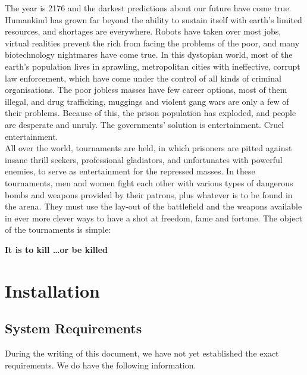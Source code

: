 \documentclass[a4paper,twoside,11pt]{book}
\theoremstyle{plain} \newtheorem{powerup}{Power-Up}
\begin{document}
   The year is 2176 and the darkest predictions about our future have come true. Humankind has grown far beyond the ability to sustain itself with earth's limited resources, and shortages are everywhere. Robots have taken over most jobs, virtual realities prevent the rich from facing the problems of the poor, and many biotechnology nightmares have come true. In this dystopian world, most of the earth's population lives in sprawling, metropolitan cities with ineffective, corrupt law enforcement, which have come under the control of all kinds of criminal organisations. The poor jobless masses have few career options, most of them illegal, and drug trafficking, muggings and violent gang wars are only a few of their problems. Because of this, the prison population has exploded, and people are desperate and unruly. The governments' solution is entertainment. Cruel entertainment. \\

    All over the world, tournaments are held, in which prisoners are pitted against insane thrill seekers, professional gladiators, and unfortunates with powerful enemies, to serve as entertainment for the repressed masses. In these tournaments, men and women fight each other with various types of dangerous bombs and weapons provided by their patrons, plus whatever is to be found in the arena. They must use the lay-out of the battlefield and the weapons available in ever more clever ways to have a shot at freedom, fame and fortune. The object of the tournaments is simple: \\

\begin{center}
\textbf{It is to kill \ldots or be killed}    
\end{center}



\chapter{Installation} %
\label{cha:installation}

    \section{System Requirements} %
    \label{sec:system_requirements}
        During the writing of this document, we have not yet established the exact requirements. We do have the following information.
        
\end{document}
